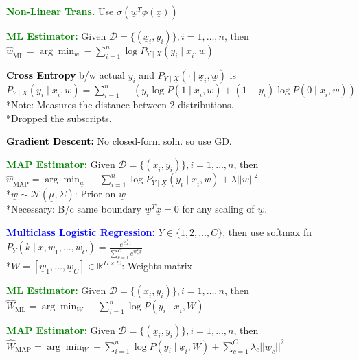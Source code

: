 \documentclass[5pt]{extarticle} %
\begin{document}
\begin{paracol}{3}
{    \textcolor{green}{\textbf{Non-Linear Trans.}} Use $\sigma(\underline{w}^T \underline{\phi}(\underline{x}))$ 

    \textcolor{green}{\textbf{ML Estimator:}} Given $\mathcal{D} = \{(\underline{x}_i, y_i)\}, i=1,\ldots,n$, then $\hat{\underline{w}}_{\text{ML}} = \arg \min_{\underline{w}} - \sum_{i=1}^n \log P_{Y \mid \underline{X}}(y_i \mid \underline{x}_i, \underline{w})$

    \textcolor{black}{\textbf{Cross Entropy}} b/w actual $y_i$ and $P_{Y \mid \underline{X}} (\cdot \mid \underline{x}_i, \underline{w})$ is \\
    $P_{Y \mid \underline{X}}(y_i \mid \underline{x}_i, \underline{w}) = \sum_{i=1}^n - \left(y_i \log P(1 \mid \underline{x}_i, \underline{w}) + (1 - y_i) \log P(0 \mid \underline{x}_i, \underline{w})\right)$ \\ 
    *Note: Measures the distance between 2 distributions. \\
    *Dropped the subscripts.

    \textcolor{black}{\textbf{Gradient Descent:}} No closed-form soln. so use GD.

    \textcolor{green}{\textbf{MAP Estimator:}} Given $\mathcal{D} = \{(\underline{x}_i, y_i)\}, i=1,\ldots,n$, then \\
    $\hat{\underline{w}}_{\text{MAP}} = \arg \min_{\underline{w}} - \sum_{i=1}^n \log P_{Y \mid \underline{X}}(y_i \mid \underline{x}_i, \underline{w}) + \lambda ||\underline{w}||^2$ \\
    *$\underline{w} \sim \mathcal{N}(\underline{\mu}, \Sigma)$: Prior on $\underline{w}$ \\
    *Necessary: B/c same boundary $\underline{w}^T \underline{x} = 0$ for any scaling of $\underline{w}$.

    \textcolor{blue}{\textbf{Multiclass Logistic Regression:}} $Y \in \{1,2,\ldots,C\}$, then use softmax fn $P_Y(k \mid \underline{x}, \underline{w}_1, \ldots, \underline{w}_C) = \frac{e^{\underline{w}_k^T \underline{x}}}{\sum_{c=1}^C e^{\underline{w}_c^T \underline{x}}}$ \\
    *$W=[\underline{w}_1, \ldots, \underline{w}_C] \in \mathbb{R}^{D \times C}$: Weights matrix 

    \textcolor{green}{\textbf{ML Estimator:}} Given $\mathcal{D} = \{(\underline{x}_i, y_i)\}, i=1,\ldots,n$, then $\hat{W}_{\text{ML}} = \arg \min_W - \sum_{i=1}^n \log P(y_i \mid \underline{x}_i, W)$ 

    \textcolor{green}{\textbf{MAP Estimator:}} Given $\mathcal{D} = \{(\underline{x}_i, y_i)\}, i=1,\ldots,n$, then \\
    $\hat{W}_{\text{MAP}} = \arg \min_W - \sum_{i=1}^n \log P(y_i \mid \underline{x}_i, W) + \sum_{c=1}^C \lambda_c ||\underline{w}_c||^2$ 

}
\end{paracol}
\end{document}
